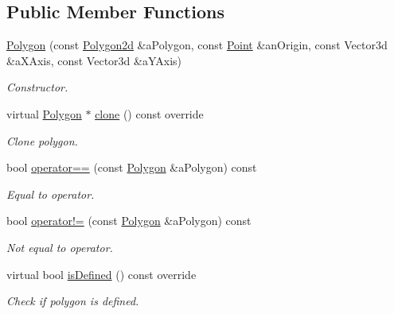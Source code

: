 \subsection*{Public Member Functions}
\begin{DoxyCompactItemize}
\item 
\hyperlink{classlibrary_1_1math_1_1geom_1_1d3_1_1objects_1_1_polygon_aee1e0d3717938cf06752ea06bb623d94}{Polygon} (const \hyperlink{namespacelibrary_1_1math_1_1geom_1_1d3_1_1objects_ae339035ccf9a6f4f0d2945fdcfd76f95}{Polygon2d} \&a\+Polygon, const \hyperlink{classlibrary_1_1math_1_1geom_1_1d3_1_1objects_1_1_point}{Point} \&an\+Origin, const Vector3d \&a\+X\+Axis, const Vector3d \&a\+Y\+Axis)
\begin{DoxyCompactList}\small\item\em Constructor. \end{DoxyCompactList}\item 
virtual \hyperlink{classlibrary_1_1math_1_1geom_1_1d3_1_1objects_1_1_polygon}{Polygon} $\ast$ \hyperlink{classlibrary_1_1math_1_1geom_1_1d3_1_1objects_1_1_polygon_a54440dcce091424ecabdacc30892c2fc}{clone} () const override
\begin{DoxyCompactList}\small\item\em Clone polygon. \end{DoxyCompactList}\item 
bool \hyperlink{classlibrary_1_1math_1_1geom_1_1d3_1_1objects_1_1_polygon_ac8aa92cf9ed3cbcd063df07ce3a89f60}{operator==} (const \hyperlink{classlibrary_1_1math_1_1geom_1_1d3_1_1objects_1_1_polygon}{Polygon} \&a\+Polygon) const
\begin{DoxyCompactList}\small\item\em Equal to operator. \end{DoxyCompactList}\item 
bool \hyperlink{classlibrary_1_1math_1_1geom_1_1d3_1_1objects_1_1_polygon_adaa065fdf80585b0d929151efe07212e}{operator!=} (const \hyperlink{classlibrary_1_1math_1_1geom_1_1d3_1_1objects_1_1_polygon}{Polygon} \&a\+Polygon) const
\begin{DoxyCompactList}\small\item\em Not equal to operator. \end{DoxyCompactList}\item 
virtual bool \hyperlink{classlibrary_1_1math_1_1geom_1_1d3_1_1objects_1_1_polygon_af657beeabcef0af4b8c2fbea4ace6341}{is\+Defined} () const override
\begin{DoxyCompactList}\small\item\em Check if polygon is defined. \end{DoxyCompactList}\item 

\end{DoxyCompactItemize}
